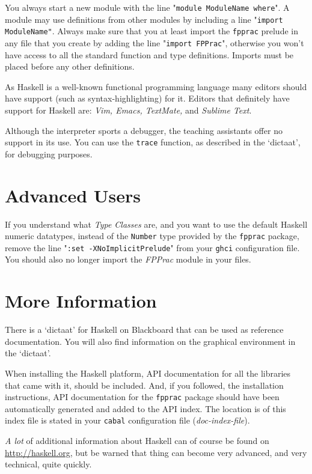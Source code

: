 \documentclass[]{article}
\begin{document}
You always start a new module with the line "\texttt{module ModuleName where}".
A module may use definitions from other modules by including a line "\texttt{import ModuleName"}.
Always make sure that you at least import the \texttt{fpprac} prelude in any file that you create by adding the line "\texttt{import FPPrac}", otherwise you won't have access to all the standard function and type definitions. 
Imports must be placed before any other definitions.

As Haskell is a well-known functional programming language many editors should have support (such as syntax-highlighting) for it.
Editors that definitely have support for Haskell are: \emph{Vim, Emacs, TextMate,} and \emph{Sublime Text}. 

Although the interpreter sports a debugger, the teaching assistants offer no support in its use.
You can use the \texttt{trace} function, as described in the `dictaat', for debugging purposes.

\section{Advanced Users}
If you understand what \emph{Type Classes} are, and you want to use the default Haskell numeric datatypes, instead of the \texttt{Number} type provided by the \texttt{fpprac} package, remove the line "\texttt{:set -XNoImplicitPrelude}" from your \texttt{ghci} configuration file.
You should also no longer import the \emph{FPPrac} module in your files. 

\section{More Information}
There is a `dictaat' for Haskell on Blackboard that can be used as reference documentation.
You will also find information on the graphical environment in the `dictaat'.

When installing the Haskell platform, API documentation for all the libraries that came with it, should be included.
And, if you followed, the installation instructions, API documentation for the \texttt{fpprac} package should have been automatically generated and added to the API index.
The location is of this index file is stated in your \texttt{cabal} configuration file (\emph{doc-index-file}). 

\emph{A lot} of additional information about Haskell can of course be found on \url{http://haskell.org}, but be warned that thing can become very advanced, and very technical, quite quickly.


\end{document}
